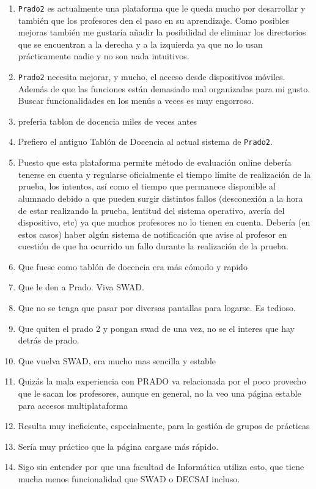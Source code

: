 \begin{enumerate}
\item \texttt{Prado2} es actualmente una plataforma que le queda mucho por desarrollar y también que los profesores den el paso en su aprendizaje. Como posibles mejoras también me gustaría añadir la posibilidad de eliminar los directorios que se encuentran a la derecha y a la izquierda ya que no lo usan prácticamente nadie y no son nada intuitivos.
\item \texttt{Prado2} necesita mejorar, y mucho, el acceso desde dispositivos móviles. Además de que las funciones están demasiado mal organizadas para mi gusto. Buscar funcionalidades en los menús a veces es muy engorroso.
\item preferia tablon de docencia miles de veces antes
\item Prefiero el antiguo Tablón de Docencia al actual sistema de \texttt{Prado2}.
\item Puesto que esta plataforma permite método de evaluación online debería tenerse en cuenta y regularse oficialmente el tiempo límite de realización de la prueba, los intentos, así como el tiempo que permanece disponible al alumnado debido a que pueden surgir distintos fallos (desconexión a la hora de estar realizando la prueba, lentitud del sistema operativo, avería del dispositivo, etc) ya que muchos profesores no lo tienen en cuenta. Debería (en estos casos) haber algún sistema de notificación que avise al profesor en cuestión de que ha ocurrido un fallo durante la realización de la prueba.
\item Que fuese como tablón de docencia era más cómodo y rapido
\item Que le den a Prado. Viva SWAD.
\item Que no se tenga que pasar por diversas pantallas para logarse. Es tedioso.
\item Que quiten el prado 2 y pongan swad de una vez, no se el interes que hay detrás de prado.
\item Que vuelva SWAD, era mucho mas sencilla y estable
\item Quizás la mala experiencia con PRADO va relacionada por el poco provecho que le sacan los profesores, aunque en general, no la veo una página estable para accesos multiplataforma
\item Resulta muy ineficiente, especialmente, para la gestión de grupos de prácticas
\item Sería muy práctico que la página cargase más rápido.
\item Sigo sin entender por que una facultad de Informática utiliza esto, que tiene mucha menos funcionalidad que SWAD o DECSAI incluso.

\end{enumerate}
